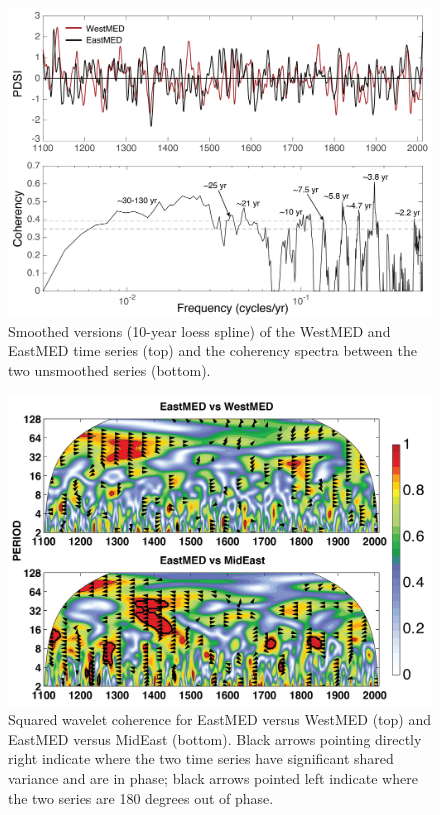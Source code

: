 \documentclass[draft,jgr]{AGUTeX}
\begin{document}
\begin{figure}
\center
\includegraphics[width=0.9\columnwidth]{fig_09_eastwest_cohere.png}
\caption{Smoothed versions (10-year loess spline) of the WestMED and EastMED time series (top) and the coherency spectra between the two unsmoothed series (bottom).}\label{placeholder}
\end{figure}

\begin{figure}
\center
\includegraphics[width=1.0\columnwidth]{fig_10_wavelet_coh.png}
\caption{Squared wavelet coherence for EastMED versus WestMED (top) and EastMED versus MidEast (bottom). Black arrows pointing directly right indicate where the two time series have significant shared variance and are in phase; black arrows pointed left indicate where the two series are 180 degrees out of phase.}\label{placeholder}
\end{figure}
\end{document}
